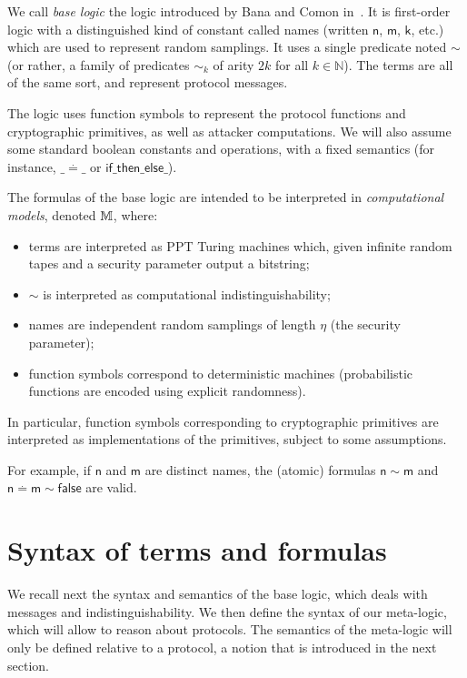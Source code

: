 We call \emph{base logic} the logic introduced by Bana and Comon in~\cite{Bana:2014:CCS:2660267.2660276}.
It is first-order logic with a distinguished kind of constant called names (written $\mathsf{n}$, $\mathsf{m}$, $\mathsf{k}$, etc.) which are used to represent random samplings. It uses a single predicate noted $\sim$ (or rather, a family
of predicates $\sim_k$ of arity $2 k$ for all $k\in\mathbb{N}$).
The terms are all of the same sort, and represent protocol messages.

The logic uses function symbols to represent the protocol functions and cryptographic primitives, as well as attacker computations.
We will also assume some standard boolean constants and operations, with
a fixed semantics (for instance, $\_ \stackrel{.}{=} \_$ or
$\mathsf{if \_ then \_ else \_}$).

The formulas of the base logic are intended to be interpreted in
\emph{computational models}, denoted $\mathbb{M}$, where:
\begin{itemize}
  \item terms are interpreted as PPT Turing machines which,
    given infinite random tapes and a security parameter output a bitstring;
  \item $\sim$ is interpreted as computational indistinguishability;
  \item names are independent random samplings of length $\eta$ (the security parameter);
  \item function symbols correspond to deterministic machines (probabilistic functions are encoded using explicit randomness).
\end{itemize}

In particular, function symbols corresponding to cryptographic primitives
are interpreted as implementations of the primitives, subject to some
assumptions.

For example, if $\mathsf{n}$ and $\mathsf{m}$ are distinct names,
the (atomic) formulas $\mathsf{n}\sim\mathsf{m}$ and
$\mathsf{n}\stackrel{.}{=}\mathsf{m}\sim\mathsf{false}$
are valid.

\section{Syntax of terms and formulas}

We recall next the syntax and semantics of the base logic, which deals with
messages and indistinguishability.
We then define the syntax of our meta-logic, which will allow to reason about
protocols. The semantics of the meta-logic will only be defined relative to a
protocol, a notion that is introduced in the next section.

